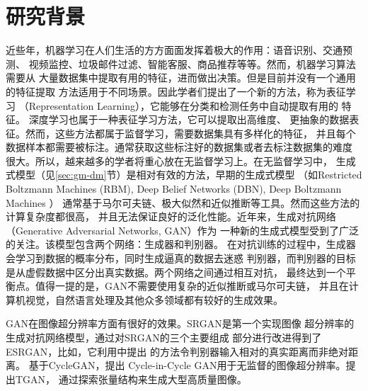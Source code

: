 \section{研究背景}
近些年，机器学习在人们生活的方方面面发挥着极大的作用：语音识别、交通预测、
视频监控、垃圾邮件过滤、智能客服、商品推荐等等。然而，机器学习算法需要从
大量数据集中提取有用的特征，进而做出决策。但是目前并没有一个通用的特征提取
方法适用于不同场景。因此学者们提出了一个新的方法，称为表征学习
（Representation Learning），它能够在分类和检测任务中自动提取有用的
特征\cite{bengio2013representation}。
深度学习\cite{lecun2015deep}也属于一种表征学习方法，它可以提取出高维度、
更抽象的数据表征。然而，这些方法都属于监督学习，需要数据集具有多样化的特征，
并且每个数据样本都需要被标注。通常获取这些标注好的数据集或者去标注数据集的难度
很大。所以，越来越多的学者将重心放在无监督学习上。在无监督学习中，
生成式模型（见\ref{sec:gm-dm}节）是相对有效的方法，早期的生成式模型
（如Restricted Boltzmann Machines (RBM)\cite{smolensky1986information},
Deep Belief Networks (DBN)\cite{hinton2006fast}, Deep Boltzmann Machines
\cite{salakhutdinov2009deep}
）
通常基于马尔可夫链、极大似然和近似推断等工具。然而这些方法的计算复杂度都很高，
并且无法保证良好的泛化性能。近年来，生成对抗网络
（Generative Adversarial Networks, GAN）\cite{goodfellow2014generative}作为
一种新的生成式模型受到了广泛的关注。该模型包含两个网络：生成器和判别器。
在对抗训练的过程中，生成器会学习到数据的概率分布，同时生成逼真的数据去迷惑
判别器，而判别器的目标是从虚假数据中区分出真实数据。两个网络之间通过相互对抗，
最终达到一个平衡点。值得一提的是，GAN不需要使用复杂的近似推断或马尔可夫链，
并且在计算机视觉，自然语言处理及其他众多领域都有较好的生成效果。


GAN在图像超分辨率方面有很好的效果。SRGAN\cite{ledig2017photo}是第一个实现图像
超分辨率的生成对抗网络模型，\citet{wang2018esrgan}通过对SRGAN的三个主要组成
部分进行改进得到了ESRGAN，比如，它利用\citet{jolicoeur2018relativistic}中提出
的方法令判别器输入相对的真实距离而非绝对距离。
基于CycleGAN\cite{zhu2017unpaired}，\citet{yuan2018unsupervised}提出
Cycle-in-Cycle GAN用于无监督的图像超分辨率。\citet{ding2019tgan}提出TGAN，
通过探索张量结构来生成大型高质量图像。

